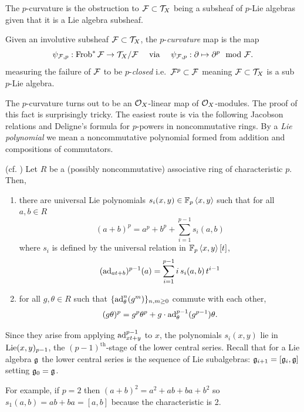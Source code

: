 \documentclass[main.tex]{subfiles}
\begin{document}
The $p$-curvature is the obstruction to $\mathcal{F} \subset \mathcal{T}_X$ being a subsheaf of $p$-Lie algebras given that it is a Lie algebra subsheaf. 


\begin{defn}
Given an involutive subsheaf $\mathcal{F} \subset \mathcal{T}_X$, the $p$-\textit{curvature} map is the map
\[ \psi_{\mathcal{F},p} : \operatorname{\mathrm{Frob}}^* \mathcal{F} \to \mathcal{T}_X / \mathcal{F} \quad  \text{ via } \quad \psi_{\mathcal{F},p} : \partial \mapsto \partial^p \mod {\mathcal{F}}. \]
measuring the failure of $\mathcal{F}$ to be $p$-\textit{closed} i.e.\ $\mathcal{F}^p \subset \mathcal{F}$ meaning $\mathcal{F} \subset \mathcal{T}_X$ is a sub $p$-Lie algebra.
\end{defn}

The $p$-curvature turns out to be an $\mathcal{O}_X$-linear map of $\mathcal{O}_X$-modules. The proof of this fact is surprisingly tricky. The easiest route is via the following Jacobson relations and Deligne's formula for $p$-powers in noncommutative rings. By a \textit{Lie polynomial} we mean a noncommutative polynomial formed from addition and compositions of commutators.

\begin{lemma} (cf. \cite[Theorem~5.3]{katz:nilpotent_connections})
Let $R$ be a (possibly noncommutative) associative ring of characteristic $p$. Then,
\begin{enumerate}
\item there are universal Lie polynomials $s_i(x,y) \in \mathbb{F}_p \left< x, y \right>$ such that for all $a,b \in R$
\[ (a + b)^p = a^p + b^p + \sum_{i = 1}^{p-1} s_i(a,b) \]
where $s_i$ is defined by the universal relation in $\mathbb{F}_p \left< x, y \right>[t]$,
\[ (\operatorname{\mathrm{ad}}_{a t + b})^{p-1}(a) = \sum_{i = 1}^{p-1} i \, s_i(a,b) \, t^{i-1} \]
\item for all $g, \theta \in R$ such that $\{ \operatorname{\mathrm{ad}}_{\theta}^n(g^m) \}_{n,m \ge 0}$ commute with each other,
\[ (g \theta)^p = g^p \theta^p + g \cdot \operatorname{\mathrm{ad}}_{\theta}^{p-1}(g^{p-1}) \theta. \]
\end{enumerate}
\end{lemma}

\begin{rmk}
Since they arise from applying $\operatorname{\mathrm{ad}}_{x t + y}^{p-1}$ to $x$, the polynomials $s_i(x,y)$ lie in $\mathrm{Lie}(x,y)_{p-1}$, the $(p-1)^{\text{th}}$-stage of the lower central series. Recall that for a Lie algebra $\mathfrak{g}$ the lower central series is the sequence of Lie subalgebras: $\mathfrak{g}_{i+1} = [\mathfrak{g}_i, \mathfrak{g}]$ setting $\mathfrak{g}_0 = \mathfrak{g}$. 
\end{rmk}


\begin{example}
For example, if $p = 2$ then $(a + b)^2 = a^2 + ab + ba + b^2$ so $s_1(a,b) = ab + ba = [a,b]$ because the characteristic is 2.
\end{example}
\end{document}
